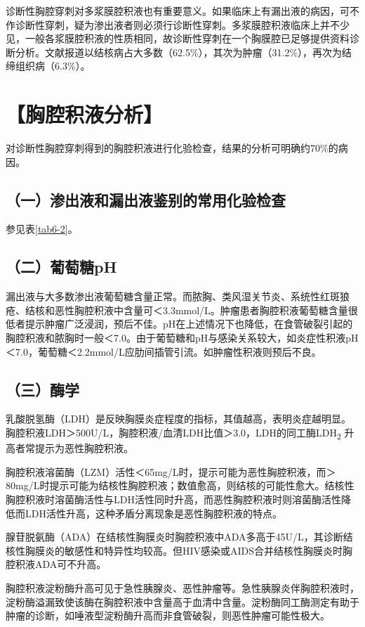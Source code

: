 诊断性胸腔穿刺对多浆膜腔积液也有重要意义。如果临床上有漏出液的病因，可不作诊断性穿刺，疑为渗出液者则必须行诊断性穿刺。多浆膜腔积液临床上并不少见，一般各浆膜腔积液的性质相同，故诊断性穿刺在一个胸膜腔已足够提供资料诊断分析。文献报道以结核病占大多数（62.5\%），其次为肿瘤（31.2\%），再次为结缔组织病（6.3\%）。

\section{【胸腔积液分析】}

对诊断性胸腔穿刺得到的胸腔积液进行化验检查，结果的分析可明确约70\%的病因。

\subsection{（一）渗出液和漏出液鉴别的常用化验检查}

参见表\ref{tab6-2}。

\subsection{（二）葡萄糖pH}

漏出液与大多数渗出液葡萄糖含量正常。而脓胸、类风湿关节炎、系统性红斑狼疮、结核和恶性胸腔积液中含量可＜3.3mmol/L。肿瘤患者胸腔积液葡萄糖含量很低者提示肿瘤广泛浸润，预后不佳。pH在上述情况下也降低，在食管破裂引起的胸腔积液和脓胸时一般＜7.0。由于葡萄糖和pH与感染关系较大，如炎症性积液pH＜7.0，葡萄糖＜2.2mmol/L应肋间插管引流。如肿瘤性积液则预后不良。

\subsection{（三）酶学}

乳酸脱氢酶（LDH）是反映胸膜炎症程度的指标，其值越高，表明炎症越明显。胸腔积液LDH＞500U/L，胸腔积液/血清LDH比值＞3.0，LDH的同工酶LDH\textsubscript{2}
升高者常提示为恶性胸腔积液。

胸腔积液溶菌酶（LZM）活性＜65mg/L时，提示可能为恶性胸腔积液，而＞80mg/L时提示可能为结核性胸腔积液；数值愈高，则结核的可能性愈大。结核性胸腔积液时溶菌酶活性与LDH活性同时升高，而恶性胸腔积液时则溶菌酶活性降低而LDH活性升高，这种矛盾分离现象是恶性胸腔积液的特点。

腺苷脱氨酶（ADA）在结核性胸膜炎时胸腔积液中ADA多高于45U/L，其诊断结核性胸膜炎的敏感性和特异性均较高。但HIV感染或AIDS合并结核性胸膜炎时胸腔积液ADA可不升高。

胸腔积液淀粉酶升高可见于急性胰腺炎、恶性肿瘤等。急性胰腺炎伴胸腔积液时，淀粉酶溢漏致使该酶在胸腔积液中含量高于血清中含量。淀粉酶同工酶测定有助于肿瘤的诊断，如唾液型淀粉酶升高而非食管破裂，则恶性肿瘤可能性极大。

